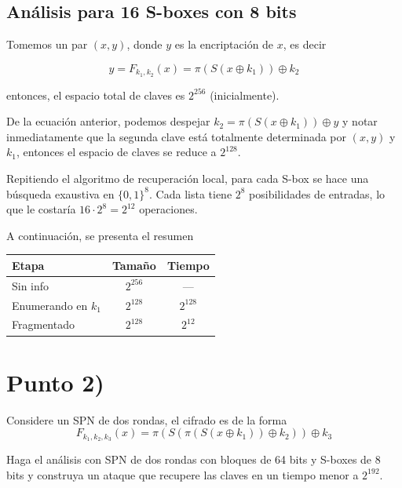 \documentclass{article}
\begin{document}
    \subsection{Análisis para 16 S-boxes con 8 bits}
      Tomemos un par $(x, y)$, donde $y$ es la encriptación de $x$, es decir

        \[y = F_{k_1, k_2}(x) = \pi(S(x \oplus k_1)) \oplus k_2\]

      entonces, el espacio total de claves es $2^{256}$ (inicialmente).
      \newline \newline

      De la ecuación anterior, podemos despejar $k_2 =  \pi(S(x \oplus k_1)) \oplus y$ 
      y notar inmediatamente que la segunda clave está totalmente determinada 
      por $(x, y)$ y $k_1$, entonces el espacio de claves se reduce a $2^{128}$.
      \newline \newline

      Repitiendo el algoritmo de recuperación local, para cada 
      S-box se hace una búsqueda exaustiva en $\{0, 1\}^8$. Cada 
      lista tiene $2^8$ posibilidades de entradas, lo que le costaría
      $16 \cdot 2^8 = 2^{12}$ operaciones.

      A continuación, se presenta el resumen
      \begin{table}[h]
        \centering

        \vspace{0.2cm}
        \begin{tabular}{lcc}
          \toprule
          Etapa & Tamaño & Tiempo \\
          \midrule
          Sin info & $2^{256}$ & --- \\
          Enumerando en $k_1$ & $2^{128}$ & $2^{128}$ \\
          Fragmentado & $2^{128}$ & $2^{12}$ \\
          \bottomrule
        \end{tabular}
      \end{table}

  \section{Punto 2)}
    Considere un SPN de dos rondas, el cifrado es de la forma
      \[F_{k_1, k_2, k_3}(x) = \pi(S(\pi(S(x \oplus k_1)) \oplus k_2)) \oplus k_3\]

    Haga el análisis con SPN de dos rondas con bloques de 64 bits y 
    S-boxes de 8 bits y construya un ataque que recupere las claves 
    en un tiempo menor a $2^{192}$.
\end{document}
